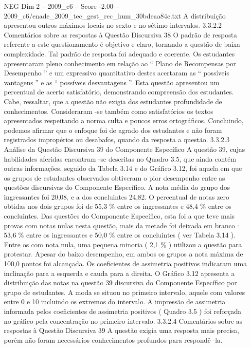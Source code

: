 \begin{textsample}{NEG Dim 2 – 2009\_c6 – Score -2.00 – 2009\_c6/enade\_2009\_tec\_gest\_rec\_hum\_30bdeaa84c.txt}
A distribuição apresentou outros máximos locais no sexto e no sétimo intervalos. 3.3.2.2 Comentários sobre as respostas à Questão Discursiva 38 O padrão de resposta referente a este questionamento é objetivo e claro, tornando a questão de baixa complexidade.
Tal padrão de resposta foi adequado e coerente.
Os estudantes apresentaram pleno conhecimento em relação ao “ Plano de Recompensas por Desempenho ” e um expressivo quantitativo destes acertaram as “ possíveis vantagens ” e as “ possíveis desvantagens ”.
Esta questão apresentou um percentual de acerto satisfatório, demonstrando compreensão dos estudantes.
Cabe, ressaltar, que a questão não exigia dos estudantes profundidade de conhecimentos.
Consideraram -se também como satisfatórios os textos apresentados respeitando a norma culta e poucos erros ortográficos.
Concluindo, podemos afirmar que o enfoque foi de agrado dos estudantes e não foram registrados impropérios ou desabafos, quando da resposta a questão. 3.3.2.3 Análise da Questão Discursiva 39 do Componente Específico A questão 39, cujas habilidades aferidas encontram -se descritas no Quadro 3.5, que ainda contém outras informações, seguido da Tabela 3.14 e do Gráfico 3.12, foi aquela em que os grupos de estudantes observados obtiveram o pior desempenho entre as questões discursivas do Componente Específico.
A nota média do grupo dos ingressantes foi 20,08, e a dos concluintes 24,82.
O percentual de notas zero obtidas nos dois grupos foi de 55,3 \% entre os ingressantes e 48,4 \% entre os concluintes.
Das questões do Componente Específico, esta foi a que teve mais provas com notas nulas nesta questão, mais da metade foi deixada em branco : 53,6 \% entre os ingressantes e 50,0 \% entre os concluintes ( ver Tabela 3.14 ).
Entre os com nota nula, uma pequena minoria ( 2,1 \% ) utilizou a questão para protestar.
Apesar do baixo desempenho, em ambos os grupos a nota máxima de 100,0 pontos foi alcançada.
Os coeficientes de assimetria positivos indicaram uma inclinação para a esquerda e cauda para a direita.
O Gráfico 3.12 apresenta a distribuição das notas na questão 39 discursiva do Componente Específico por grupo de estudantes.
A moda se situou no primeiro intervalo, aquele com valores entre 0 e 10 incluindo os extremos do intervalo.
A impressão de assimetria informada pelos coeficientes de assimetria positivos ( Quadro 3.5 ) foi reforçada no gráfico pela concentração no primeiro intervalo. 3.3.2.4 Comentários sobre as respostas à Questão Discursiva 39 A questão exigia uma resposta mais precisa, porém não foram necessários conhecimentos profundos para respondê -la.

\end{textsample}

